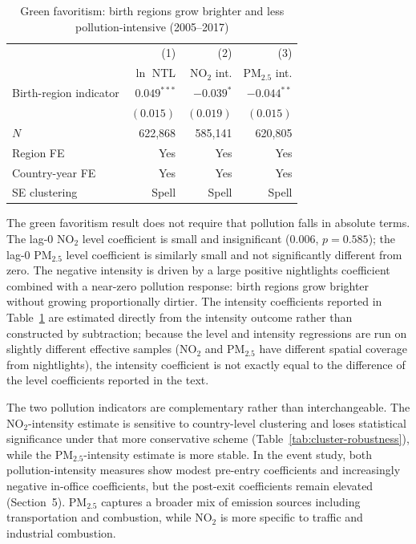 \documentclass[9pt,twocolumn,twoside]{pnas-new}
\begin{document}
\begin{table}[t]
\centering
\caption{Green favoritism: birth regions grow brighter and less pollution-intensive (2005--2017)}
\small
\begin{tabular*}{\columnwidth}{@{\extracolsep{\fill}}lrrr}
 & (1) & (2) & (3) \\
 & $\ln$ NTL & NO$_2$ int. & PM$_{2.5}$ int. \\
\midrule
Birth-region indicator & $0.049^{***}$ & $-0.039^{*}$ & $-0.044^{**}$ \\
 & $(0.015)$ & $(0.019)$ & $(0.015)$ \\
\midrule
$N$ & 622,868 & 585,141 & 620,805 \\
Region FE & Yes & Yes & Yes \\
Country-year FE & Yes & Yes & Yes \\
SE clustering & Spell & Spell & Spell \\
\bottomrule
\end{tabular*}
\label{tab:green-fav}
\end{table}

The green favoritism result does not require that pollution falls in absolute terms. The lag-0 NO$_2$ level coefficient is small and insignificant (0.006, $p = 0.585$); the lag-0 PM$_{2.5}$ level coefficient is similarly small and not significantly different from zero. The negative intensity is driven by a large positive nightlights coefficient combined with a near-zero pollution response: birth regions grow brighter without growing proportionally dirtier. The intensity coefficients reported in Table~\ref{tab:green-fav} are estimated directly from the intensity outcome rather than constructed by subtraction; because the level and intensity regressions are run on slightly different effective samples (NO$_2$ and PM$_{2.5}$ have different spatial coverage from nightlights), the intensity coefficient is not exactly equal to the difference of the level coefficients reported in the text.

The two pollution indicators are complementary rather than interchangeable. The NO$_2$-intensity estimate is sensitive to country-level clustering and loses statistical significance under that more conservative scheme (Table~\ref{tab:cluster-robustness}), while the PM$_{2.5}$-intensity estimate is more stable. In the event study, both pollution-intensity measures show modest pre-entry coefficients and increasingly negative in-office coefficients, but the post-exit coefficients remain elevated (Section~5). PM$_{2.5}$ captures a broader mix of emission sources including transportation and combustion, while NO$_2$ is more specific to traffic and industrial combustion.
\end{document}
